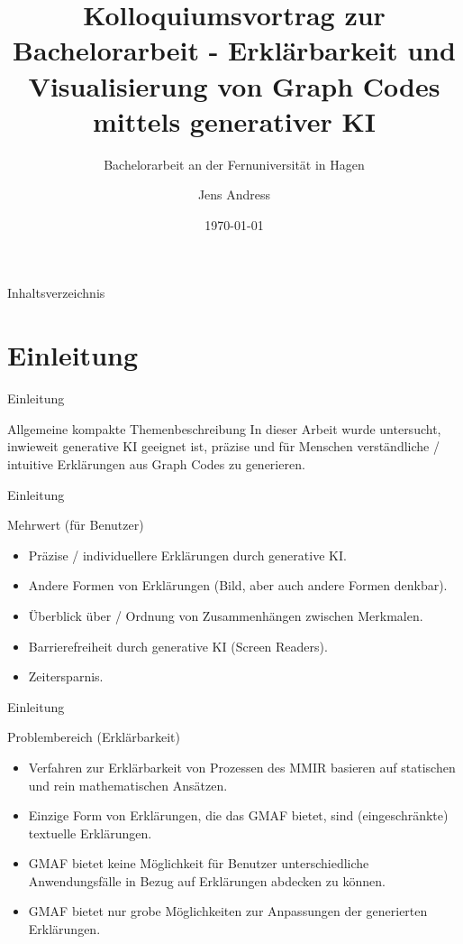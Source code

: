 \documentclass[t]{beamer}
\title{Kolloquiumsvortrag zur Bachelorarbeit - Erklärbarkeit und Visualisierung von Graph Codes mittels generativer KI}
\subtitle{Bachelorarbeit an der Fernuniversität in Hagen}
\author{Jens Andress}
\date{\today}
\institute{Lehrgebiet Multimedia und Internetanwendungen}
\begin{document}
\maketitle

\begin{frame}{Inhaltsverzeichnis}
  \tableofcontents

\end{frame}

\section{Einleitung}


\begin{frame}{Einleitung}

  \begin{exampleblock}{Allgemeine kompakte Themenbeschreibung}
    In dieser Arbeit wurde untersucht, inwieweit generative KI geeignet ist, präzise und für Menschen verständliche / intuitive Erklärungen aus Graph Codes zu generieren.
  \end{exampleblock}

\end{frame}

\begin{frame}{Einleitung}

  \begin{block}{Mehrwert (für Benutzer)}
    \begin{itemize}
      \item Präzise / individuellere Erklärungen durch generative KI.
      \item Andere Formen von Erklärungen (Bild, aber auch andere Formen denkbar).
      \item Überblick über / Ordnung von Zusammenhängen zwischen Merkmalen.
      \item Barrierefreiheit durch generative KI (Screen Readers).
      \item Zeitersparnis.
    \end{itemize}
  \end{block}

\end{frame}

\begin{frame}{Einleitung}
  \begin{block}{Problembereich (Erklärbarkeit)}
    \begin{itemize}
      \item<+-> Verfahren zur Erklärbarkeit von Prozessen des MMIR basieren auf statischen und rein mathematischen Ansätzen.
      \item<+-> Einzige Form von Erklärungen, die das GMAF bietet, sind (eingeschränkte) textuelle Erklärungen.
      \item<+-> GMAF bietet keine Möglichkeit für Benutzer unterschiedliche Anwendungsfälle in Bezug auf Erklärungen abdecken zu können.
      \item<+-> GMAF bietet nur grobe Möglichkeiten zur Anpassungen der generierten Erklärungen.
    \end{itemize}
  \end{block}
\end{frame}
\end{document}
